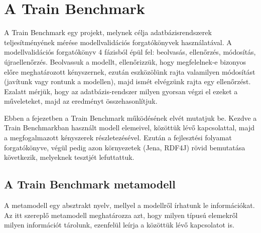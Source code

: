 \chapter{A Train Benchmark}

A Train Benchmark\cite{Szárnyas2017} egy projekt, melynek célja adatbázisrendszerek teljesítményének mérése modellvalidációs forgatókönyvek használatával. A modellvalidációs forgatókönyv 4 fázisból épül fel: beolvasás, ellenőrzés, módosítás, újraellenőrzés. Beolvassuk a modellt, ellenőrizzük, hogy megfelelnek-e bizonyos előre meghatározott kényszernek, ezután eszközölünk rajta valamilyen módosítást (javítunk vagy rontunk a modellen), majd ismét elvégzünk rajta egy ellenőrzést. Ezalatt mérjük, hogy az adatbázis-rendszer milyen gyorsan végzi el ezeket a műveleteket, majd az eredményt összehasonlítjuk.

Ebben a fejezetben a Train Benchmark működésének elvét mutatjuk be. Kezdve a Train Benchmarkban használt modell elemeivel, közöttük lévő kapcsolattal, majd a megfogalmazott kényszerek részletezésével. Ezután a fejlesztési folyamat forgatókönyve, végül pedig azon környezetek (Jena, RDF4J) rövid bemutatása következik, melyeknek tesztjét lefuttattuk.

\section{A Train Benchmark metamodell}

A metamodell egy absztrakt nyelv, mellyel a modellről írhatunk le információkat.\cite{pickametamodeling} Az itt szereplő metamodell meghatározza azt, hogy milyen típusú elemekről milyen információt tárolunk, ezenfelül leírja a közöttük lévő kapcsolatot is.

